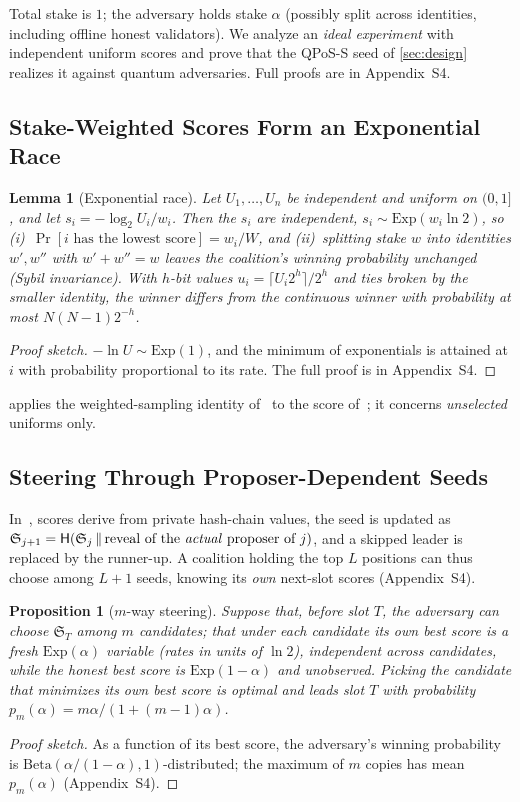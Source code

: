 \documentclass[10pt,journal,compsoc]{IEEEtran}
\theoremstyle{tplain}
\newtheorem{lemma}[theorem]{Lemma}
\newtheorem{proposition}[theorem]{Proposition}
\theoremstyle{tdef}
\theoremstyle{remark}
\newcommand{\supp}[1]{Appendix~#1}
\newcommand{\Hash}{\mathsf{H}}
\newcommand{\cS}{\mathfrak{S}}
\begin{document}
Total stake is $1$; the adversary holds stake $\alpha$ (possibly split across identities, including offline honest validators). We analyze an \emph{ideal experiment} with independent uniform scores and prove that the QPoS-S seed of \cref{sec:design} realizes it against quantum adversaries. Full proofs are in \supp{S4}.

\subsection{Stake-Weighted Scores Form an Exponential Race}

\begin{lemma}[Exponential race]\label{lem:race}
Let $U_1,\dots,U_n$ be independent and uniform on $(0,1]$, and let $s_i=-\log_2 U_i/w_i$. Then the $s_i$ are independent, $s_i\sim\mathrm{Exp}(w_i\ln 2)$, so (i)~$\Pr[i\text{ has the lowest score}]=w_i/W$, and (ii)~splitting stake $w$ into identities $w',w''$ with $w'+w''=w$ leaves the coalition's winning probability unchanged (Sybil invariance). With $h$-bit values $u_i=\lceil U_i2^h\rceil/2^h$ and ties broken by the smaller identity, the winner differs from the continuous winner with probability at most $N(N-1)2^{-h}$.
\end{lemma}
\begin{proof}[Proof sketch]
$-\ln U\sim\mathrm{Exp}(1)$, and the minimum of exponentials is attained at $i$ with probability proportional to its rate. The full proof is in \supp{S4}.
\end{proof}

\noindent{} applies the weighted-sampling identity of~\cite{efraimidis2006} to the score of~\cite{QRL}; it concerns \emph{unselected} uniforms only.

\subsection{Steering Through Proposer-Dependent Seeds}
In~\cite{QRL,myeprint}, scores derive from private hash-chain values, the seed is updated as $\cS_{j+1}=\Hash(\cS_j\,\|\,\text{reveal of the \emph{actual} proposer of }j)$, and a skipped leader is replaced by the runner-up. A coalition holding the top $L$ positions can thus choose among $L+1$ seeds, knowing its \emph{own} next-slot scores (\supp{S4}).

\begin{proposition}[$m$-way steering]\label{prop:steer}
Suppose that, before slot $T$, the adversary can choose $\cS_T$ among $m$ candidates; that under each candidate its own best score is a fresh $\mathrm{Exp}(\alpha)$ variable (rates in units of $\ln 2$), independent across candidates, while the honest best score is $\mathrm{Exp}(1-\alpha)$ and unobserved. Picking the candidate that minimizes its own best score is optimal and leads slot $T$ with probability $p_m(\alpha)=m\alpha/(1+(m-1)\alpha)$.
\end{proposition}
\begin{proof}[Proof sketch]
As a function of its best score, the adversary's winning probability is $\mathrm{Beta}(\alpha/(1-\alpha),1)$-distributed; the maximum of $m$ copies has mean $p_m(\alpha)$ (\supp{S4}).
\end{proof}
\end{document}
